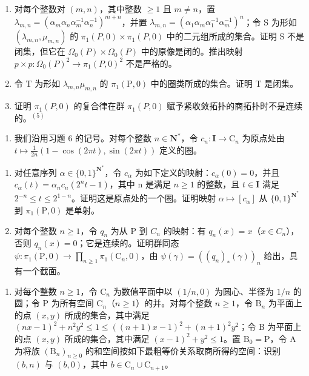 \begin{enumerate}
\def\labelenumi{\alph{enumi})}
\item
  对每个整数对 \((m,n)\)，其中整数 \(\geqslant 1\) 且 \(m \neq n\)，置 \(\lambda_{m,n} = (\alpha_{m}\alpha_{n}\alpha_{m}^{-1}\alpha_{n}^{-1})^{m+n}\)，并置 \(\lambda_{m,n} = (\alpha_{1}\alpha_{m}\alpha_{1}^{-1}\alpha_{m}^{-1})^{n}\)；令 S 为形如 \((\lambda_{m,n},\mu_{m,n})\) 的 \(\pi_{1}(P,0)\times\pi_{1}(P,0)\) 中的二元组所成的集合。证明 S 不是闭集，但它在 \(\Omega_{0}(P)\times\Omega_{0}(P)\) 中的原像是闭的。推出映射 \(p\times p\colon\Omega_{0}(P)^{2}\to\pi_{1}(P,0)^{2}\) 不是严格的。
\item
  令 T 为形如 \(\lambda_{m,n}\mu_{m,n}\) 的 \(\pi_1(\mathrm{P},0)\) 中的圈类所成的集合。证明 T 是闭集。
\item
  证明 \(\pi_{1}(P,0)\) 的复合律在群 \(\pi_{1}(P,0)\) 赋予紧收敛拓扑的商拓扑时不是连续的。\(^{(5)}\)
\end{enumerate}

\begin{enumerate}
\def\labelenumi{\arabic{enumi})}
\setcounter{enumi}{8}
\tightlist
\item
  我们沿用习题 6 的记号。对每个整数 \(n \in \mathbf{N}^*\)，令 \(c_n: \mathbf{I} \to \mathrm{C}_n\) 为原点处由 \(t \mapsto \frac{1}{2n}(1 - \cos(2\pi t), \sin(2\pi t))\) 定义的圈。\\
\end{enumerate}

\begin{enumerate}
\def\labelenumi{\alph{enumi})}
\item
  对任意序列 \(\alpha \in \{0,1\}^{\mathbf{N}^*}\)，令 \(c_\alpha\) 为如下定义的映射：\(c_\alpha(0) = 0\)，并且 \(c_\alpha(t) = \alpha_n c_n (2^n t - 1)\)，其中 n 是满足 \(n \geqslant 1\) 的整数，且 \(t \in \mathbf{I}\) 满足 \(2^{-n} \leqslant t \leqslant 2^{1-n}\)。证明这是原点处的一个圈。证明映射 \(\alpha \mapsto [c_\alpha]\) 从 \(\{0,1\}^{\mathbf{N}^*}\) 到 \(\pi_1(\mathrm{P},0)\) 是单射。
\item
  对每个整数 \(n \geqslant 1\)，令 \(q_{n}\) 为从 P 到 \(C_{n}\) 的映射：有 \(q_{n}(x) = x\)（\(x \in C_{n}\)），否则 \(q_{n}(x) = 0\)；它是连续的。证明群同态 \(\psi: \pi_{1}(\mathrm{P}, 0) \to \prod_{n \geqslant 1} \pi_{1}(\mathrm{C}_{n}, 0)\)，由 \(\psi(\gamma) = ((q_{n})_{*}(\gamma))_{n}\) 给出，具有一个截面。
\end{enumerate}

\begin{enumerate}
\def\labelenumi{\arabic{enumi})}
\setcounter{enumi}{9}
\tightlist
\item
  对每个整数 \(n \geqslant 1\)，令 \(\mathrm{C}_n\) 为数值平面中以 \((1/n,0)\) 为圆心、半径为 \(1/n\) 的圆；令 P 为所有空间 \(\mathrm{C}_n\)（\(n \geqslant 1\)）的并。对每个整数 \(n \geqslant 1\)，令 \(\mathrm{B}_n\) 为平面上的点 \((x,y)\) 所成的集合，其中满足 \((nx-1)^2 + n^2y^2 \leqslant 1 \leqslant ((n+1)x-1)^2 + (n+1)^2y^2\)；令 B 为平面上的点 \((x,y)\) 所成的集合，其中满足 \((x-1)^2 + y^2 \leqslant 1\)。置 \(\mathrm{B}_0 = \mathrm{P}\)，令 A 为将族 \((\mathrm{B}_n)_{n \geqslant 0}\) 的和空间按如下最粗等价关系取商所得的空间：识别 \((b,n)\) 与 \((b,0)\)，其中 \(b \in \mathrm{C}_n \cup \mathrm{C}_{n+1}\)。
\end{enumerate}

